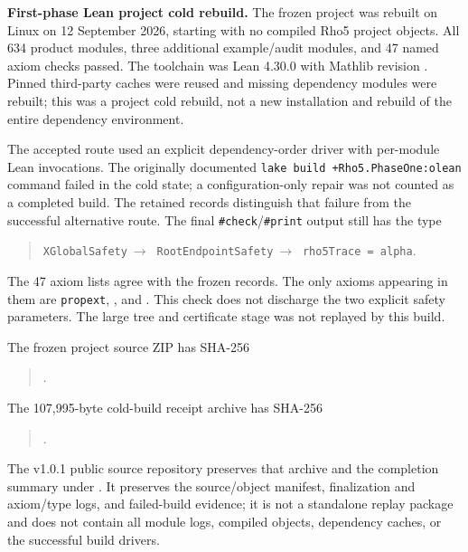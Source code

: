 \documentclass[10pt]{article}
\begin{document}
\textbf{First-phase Lean project cold rebuild.}
The frozen project was rebuilt on Linux on 12 September 2026, starting
with no compiled Rho5 project objects. All 634 product modules,
three additional example/audit modules, and 47 named axiom checks
passed. The toolchain was Lean 4.30.0 with Mathlib revision
. Pinned third-party
caches were reused and missing dependency modules were rebuilt;
this was a project cold rebuild, not a new installation and rebuild
of the entire dependency environment.

The accepted route used an explicit dependency-order driver with
per-module Lean invocations. The originally documented
\texttt{lake build +Rho5.PhaseOne:olean} command failed in the
cold state; a configuration-only repair was not counted as a completed
build. The retained records distinguish that failure from the
successful alternative route. The final \texttt{\#check}/\texttt{\#print}
output still has the type
\begin{quote}
\texttt{XGlobalSafety}\(\ \longrightarrow\ \)
\texttt{RootEndpointSafety}\(\ \longrightarrow\ \)
\texttt{rho5Trace = alpha}.
\end{quote}
The 47 axiom lists agree with the frozen records. The only axioms
appearing in them are \texttt{propext}, , and
. This check does not discharge the two explicit
safety parameters. The large tree and certificate stage was not
replayed by this build.

The frozen project source ZIP has SHA-256
\begin{quote}
.
\end{quote}
The 107,995-byte cold-build receipt archive has SHA-256
\begin{quote}
.
\end{quote}
The v1.0.1 public source repository preserves that archive and the
completion summary under . It preserves the source/object manifest,
finalization and axiom/type logs, and failed-build evidence; it is not
a standalone replay package and does not contain all module logs,
compiled objects, dependency caches, or the successful build drivers.
\end{document}
